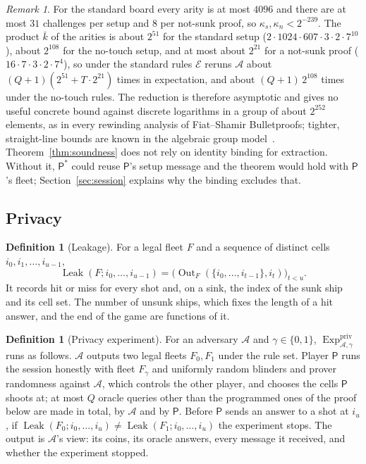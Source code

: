 \documentclass[11pt]{article}
\theoremstyle{definition}
\newtheorem{definition}[lemma]{Definition}
\theoremstyle{remark}
\newtheorem{remark}[lemma]{Remark}
\newcommand{\Exp}{\operatorname{Exp}}
\newcommand{\Out}{\operatorname{Out}}
\newcommand{\Leak}{\operatorname{Leak}}
\begin{document}
\begin{remark}
For the standard board every arity is at most $4096$ and there are at most $31$ challenges per setup and $8$ per not-sunk proof, so $\kappa_s,\kappa_n<2^{-239}$. The product $\bar k$ of the arities is about $2^{51}$ for the standard setup ($2\cdot1024\cdot607\cdot3\cdot2\cdot7^{10}$), about $2^{108}$ for the no-touch setup, and at most about $2^{21}$ for a not-sunk proof ($16\cdot7\cdot3\cdot2\cdot7^4$), so under the standard rules $\mathcal E$ reruns $\mathcal A$ about $(Q+1)(2^{51}+T\cdot2^{21})$ times in expectation, and about $(Q+1)\,2^{108}$ times under the no-touch rules. The reduction is therefore asymptotic and gives no useful concrete bound against discrete logarithms in a group of about $2^{252}$ elements, as in every rewinding analysis of Fiat--Shamir Bulletproofs; tighter, straight-line bounds are known in the algebraic group model~\cite{ganesh}. Theorem~\ref{thm:soundness} does not rely on identity binding for extraction. Without it, $\mathsf P^\ast$ could reuse $\mathsf P$'s setup message and the theorem would hold with $\mathsf P$'s fleet; Section~\ref{sec:session} explains why the binding excludes that.
\end{remark}

\subsection{Privacy}\label{sec:privacy}
\begin{definition}[Leakage]\label{def:leak}
For a legal fleet $F$ and a sequence of distinct cells $i_0,i_1,\ldots,i_{u-1}$,
\[
  \Leak(F;i_0,\ldots,i_{u-1})=\bigl(\Out_F(\{i_0,\ldots,i_{t-1}\},i_t)\bigr)_{t<u}.
\]
It records hit or miss for every shot and, on a sink, the index of the sunk ship and its cell set. The number of unsunk ships, which fixes the length of a hit answer, and the end of the game are functions of it.
\end{definition}

\begin{definition}[Privacy experiment]\label{def:priv-exp}
For an adversary $\mathcal A$ and $\gamma\in\{0,1\}$, $\Exp^{\mathrm{priv}}_{\mathcal A,\gamma}$ runs as follows. $\mathcal A$ outputs two legal fleets $F_0,F_1$ under the rule set. Player $\mathsf P$ runs the session honestly with fleet $F_\gamma$ and uniformly random blinders and prover randomness against $\mathcal A$, which controls the other player, and chooses the cells $\mathsf P$ shoots at; at most $Q$ oracle queries other than the programmed ones of the proof below are made in total, by $\mathcal A$ and by $\mathsf P$. Before $\mathsf P$ sends an answer to a shot at $i_u$, if $\Leak(F_0;i_0,\ldots,i_u)\ne\Leak(F_1;i_0,\ldots,i_u)$ the experiment stops. The output is $\mathcal A$'s view: its coins, its oracle answers, every message it received, and whether the experiment stopped.
\end{definition}
\end{document}
